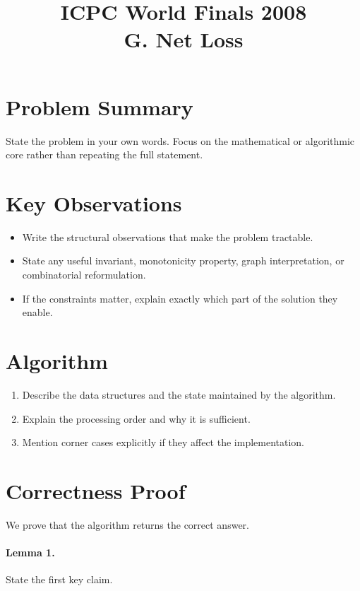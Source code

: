 \documentclass[11pt]{article}
\title{ICPC World Finals 2008\\G. Net Loss}
\author{}
\date{}
\begin{document}
\maketitle

\section*{Problem Summary}

State the problem in your own words. Focus on the mathematical or algorithmic core rather than repeating the full statement.

\section*{Key Observations}

\begin{itemize}[leftmargin=*]
    \item Write the structural observations that make the problem tractable.
    \item State any useful invariant, monotonicity property, graph interpretation, or combinatorial reformulation.
    \item If the constraints matter, explain exactly which part of the solution they enable.
\end{itemize}

\section*{Algorithm}

\begin{enumerate}[leftmargin=*]
    \item Describe the data structures and the state maintained by the algorithm.
    \item Explain the processing order and why it is sufficient.
    \item Mention corner cases explicitly if they affect the implementation.
\end{enumerate}

\section*{Correctness Proof}

We prove that the algorithm returns the correct answer.

\paragraph{Lemma 1.}
State the first key claim.
\end{document}
